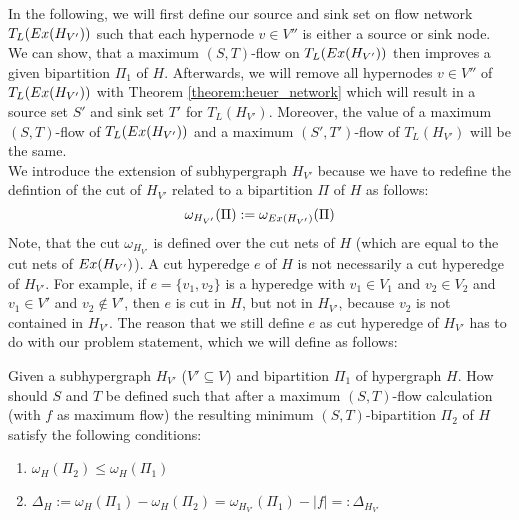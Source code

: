 In the following, we will first define our source and sink set on flow network $T_L(Ex(H_{V'}))$ such that
each hypernode $v \in V''$ is either a source or sink node. We can show, that a maximum
$(S,T)$-flow on $T_L(Ex(H_{V'}))$ then improves a given bipartition $\Pi_1$ of $H$.
Afterwards, we will remove all hypernodes $v \in V''$ of $T_L(Ex(H_{V'}))$ with
Theorem \ref{theorem:heuer_network} which will result in a source set $S'$ and sink 
set $T'$ for $T_L(H_{V'})$. Moreover, the value of a maximum $(S,T)$-flow of $T_L(Ex(H_{V'}))$
and a maximum $(S',T')$-flow of $T_L(H_{V'})$ will be the same. \\
We introduce the extension of subhypergraph $H_{V'}$ because we have to redefine the defintion
of the cut of $H_{V'}$ related to a bipartition $\Pi$ of $H$ as follows:
\begin{equation}
\label{eq:sub_cut}
\omega_{H_{V'}}(\Pi) := \omega_{Ex(H_{V'})}(\Pi)
\end{equation}
Note, that the cut $\omega_{H_{V'}}$ is defined over the cut nets of $H$ (which are equal to 
the cut nets of $Ex(H_{V'})$). A cut hyperedge $e$ of $H$ is not necessarily a cut hyperedge
of $H_{V'}$. For example, if $e = \{v_1,v_2\}$ is a hyperedge with $v_1 \in V_1$ and $v_2 \in V_2$ and
$v_1 \in V'$ and $v_2 \notin V'$, then $e$ is cut in $H$, but not in $H_{V'}$, because
$v_2$ is not contained in $H_{V'}$. The reason that we still
define $e$ as cut hyperedge of $H_{V'}$ has to do with our problem statement, 
which we will define as follows:

\begin{problem}
\label{prob:ST} 
Given a subhypergraph $H_{V'}$ ($V' \subseteq V$) and bipartition $\Pi_1$ of hypergraph $H$.
How should $S$ and $T$ be defined such that after a maximum $(S,T)$-flow calculation (with 
$f$ as maximum flow) the resulting minimum $(S,T)$-bipartition $\Pi_2$ of $H$ satisfy
the following conditions:
\begin{enumerate}
\item $\omega_H(\Pi_2) \le \omega_H(\Pi_1)$
\item $\Delta_{H} := \omega_H(\Pi_1) - \omega_H(\Pi_2) = \omega_{H_{V'}}(\Pi_1) - |f| =: \Delta_{H_{V'}}$
\end{enumerate}
\end{problem}

